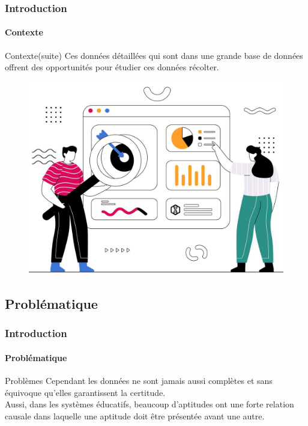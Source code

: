 \documentclass[aspectratio=169,professionalfonts, 12pt]{beamer}
\begin{document}
\begin{frame}
  \frametitle{Introduction}
  \framesubtitle{Contexte}
  \begin{minipage}{0.5\textwidth}
    \begin{block}{Contexte(suite)}
    Ces données détaillées qui sont dans une grande base de données offrent des opportunités pour étudier ces données récolter.  
    \end{block}
  \end{minipage}
  \begin{minipage}{2cm}
  
  \end{minipage}
  \begin{minipage}{0.4\textwidth}
    \begin{figure}[t]
    \begin{center}
      \includegraphics[width=\textwidth]{images/etat_art/data_oppor.jpeg}
    \end{center}
    \end{figure} 
  \end{minipage}
\end{frame}


\subsection{Problématique}

\begin{frame}
  \frametitle{Introduction}
  \framesubtitle{Problématique}
  \justifying
  \begin{alertblock}{Problèmes}
  Cependant les données ne sont jamais aussi complètes et sans équivoque qu’elles garantissent la certitude. \\
  Aussi, dans les systèmes éducatifs, beaucoup d’aptitudes ont une forte relation causale dans laquelle une aptitude doit être présentée avant une autre.
\end{alertblock}
\end{frame}
\end{document}
